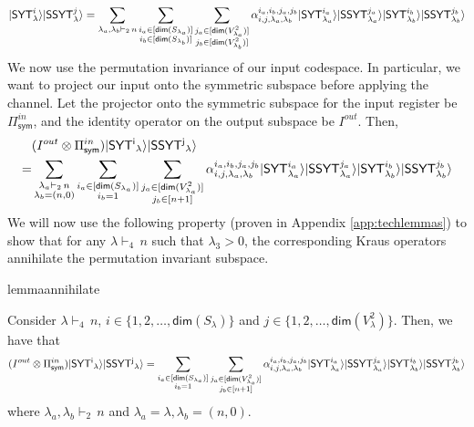 \documentclass[11pt]{article}
\DeclarePairedDelimiter\ket{\lvert}{\rangle}
\begin{document}
\begin{align}\label{eqn: kraus_in_io_form}
    \ket{\mathsf{SYT}^i_\lambda} \ket{\mathsf{SSYT}^j_\lambda} = \sum_{\lambda_a, \lambda_b \vdash_2\, n} \sum_{\substack{i_a \in [\mathsf{dim}(S_{\lambda_a})] \\i_b \in [\mathsf{dim}(S_{\lambda_b})]}}  \sum_{\substack{j_a \in [\mathsf{dim}(V^2_{\lambda_a})] \\j_b \in [\mathsf{dim}(V^2_{\lambda_b})]}}\alpha_{i, j, \lambda_a, \lambda_b}^{i_a, i_b, j_a, j_b} \ket{\mathsf{SYT}_{\lambda_a}^{i_a}} \ket{\mathsf{SSYT}_{\lambda_a}^{j_a}} \ket{\mathsf{SYT}_{\lambda_b}^{i_b}} \ket{\mathsf{SSYT}_{\lambda_b}^{j_b}}
\end{align}
We now use the permutation invariance of our input codespace. In particular, we want to project our input onto the symmetric subspace before applying the channel. Let the projector onto the symmetric subspace for the input register be $\Pi_{\mathsf{sym}}^{in}$, and the identity operator on the output subspace be $I^{out}$. Then,
\begin{align*}
    &(I^{out} \otimes \Pi_{\mathsf{sym}}^{in})\ket{\mathsf{SYT^i}_\lambda} \ket{\mathsf{SSYT^j}_\lambda} \\
    =& \sum_{\substack{\lambda_a \vdash_2\, n \\ \lambda_b = (n, 0)}} \sum_{\substack{i_a \in [\mathsf{dim}(S_{\lambda_a})] \\ i_b = 1}} \sum_{\substack{j_a \in [\mathsf{dim}(V^2_{\lambda_a})] \\ j_b \in [n+1]}} \alpha_{i, j, \lambda_a, \lambda_b}^{i_a, i_b, j_a, j_b} \ket{\mathsf{SYT}_{\lambda_a}^{i_a}} \ket{\mathsf{SSYT}_{\lambda_a}^{j_a}} \ket{\mathsf{SYT}_{\lambda_b}^{i_b}} \ket{\mathsf{SSYT}_{\lambda_b}^{j_b}}
\end{align*}
We will now use the following property (proven in Appendix \ref{app:techlemmas}) to show that for any $\lambda \vdash_4\, n$ such that $\lambda_3 > 0$, the corresponding Kraus operators annihilate the permutation invariant subspace.
\begin{restatable}{lemma}{annihilate}\label{lem:annihilate}

    Consider $\lambda \vdash_4\, n$, $i \in \{1, 2, \ldots, \mathsf{dim}(S_{\lambda})\}$ and $j \in \{1, 2, \ldots, \mathsf{dim}(V^2_{\lambda})\}$. Then, we have that
    \begin{align*}
        (I^{out} \otimes \Pi_{\mathsf{sym}}^{in})\ket{\mathsf{SYT^i}_\lambda} \ket{\mathsf{SSYT^j}_\lambda} = \sum_{\substack{i_a \in [\mathsf{dim}(S_{\lambda_a})] \\ i_b = 1}} \sum_{\substack{j_a \in [\mathsf{dim}(V^2_{\lambda_a})] \\ j_b \in [n+1]}} \alpha_{i, j, \lambda_a, \lambda_b}^{i_a, i_b, j_a, j_b} \ket{\mathsf{SYT}_{\lambda_a}^{i_a}} \ket{\mathsf{SSYT}_{\lambda_a}^{j_a}} \ket{\mathsf{SYT}_{\lambda_b}^{i_b}} \ket{\mathsf{SSYT}_{\lambda_b}^{j_b}}
    \end{align*}
    where $\lambda_a, \lambda_b \vdash_2\, n$ and $\lambda_a = \lambda, \lambda_b = (n,0)$.
\end{restatable}
\end{document}
